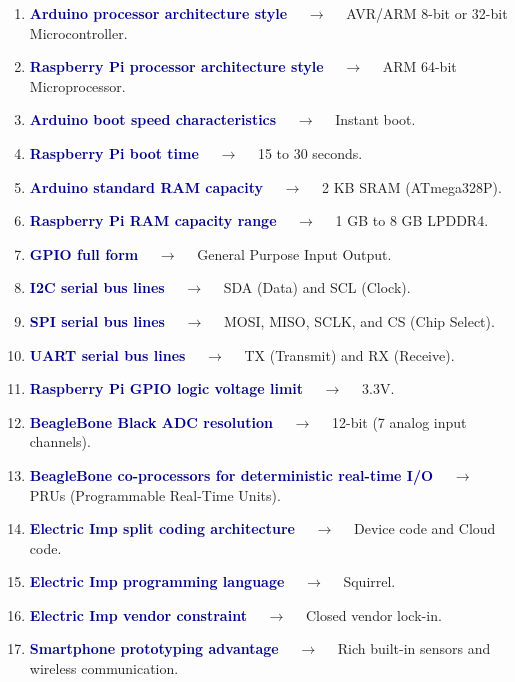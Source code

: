 \documentclass[11pt,a4paper]{article}
\begin{document}
\begin{enumerate}[label=\arabic*., leftmargin=*, labelsep=0.8em, itemsep=0.35em, parsep=0.1em, topsep=0.2em]
  \item \textcolor{darkblue}{\textbf{Arduino processor architecture style}} $\quad\to\quad$ AVR/ARM 8-bit or 32-bit Microcontroller.
  \item \textcolor{darkblue}{\textbf{Raspberry Pi processor architecture style}} $\quad\to\quad$ ARM 64-bit Microprocessor.
  \item \textcolor{darkblue}{\textbf{Arduino boot speed characteristics}} $\quad\to\quad$ Instant boot.
  \item \textcolor{darkblue}{\textbf{Raspberry Pi boot time}} $\quad\to\quad$ 15 to 30 seconds.
  \item \textcolor{darkblue}{\textbf{Arduino standard RAM capacity}} $\quad\to\quad$ 2 KB SRAM (ATmega328P).
  \item \textcolor{darkblue}{\textbf{Raspberry Pi RAM capacity range}} $\quad\to\quad$ 1 GB to 8 GB LPDDR4.
  \item \textcolor{darkblue}{\textbf{GPIO full form}} $\quad\to\quad$ General Purpose Input Output.
  \item \textcolor{darkblue}{\textbf{I2C serial bus lines}} $\quad\to\quad$ SDA (Data) and SCL (Clock).
  \item \textcolor{darkblue}{\textbf{SPI serial bus lines}} $\quad\to\quad$ MOSI, MISO, SCLK, and CS (Chip Select).
  \item \textcolor{darkblue}{\textbf{UART serial bus lines}} $\quad\to\quad$ TX (Transmit) and RX (Receive).
  \item \textcolor{darkblue}{\textbf{Raspberry Pi GPIO logic voltage limit}} $\quad\to\quad$ 3.3V.
  \item \textcolor{darkblue}{\textbf{BeagleBone Black ADC resolution}} $\quad\to\quad$ 12-bit (7 analog input channels).
  \item \textcolor{darkblue}{\textbf{BeagleBone co-processors for deterministic real-time I/O}} $\quad\to\quad$ PRUs (Programmable Real-Time Units).
  \item \textcolor{darkblue}{\textbf{Electric Imp split coding architecture}} $\quad\to\quad$ Device code and Cloud code.
  \item \textcolor{darkblue}{\textbf{Electric Imp programming language}} $\quad\to\quad$ Squirrel.
  \item \textcolor{darkblue}{\textbf{Electric Imp vendor constraint}} $\quad\to\quad$ Closed vendor lock-in.
  \item \textcolor{darkblue}{\textbf{Smartphone prototyping advantage}} $\quad\to\quad$ Rich built-in sensors and wireless communication.

\end{enumerate}
\end{document}
